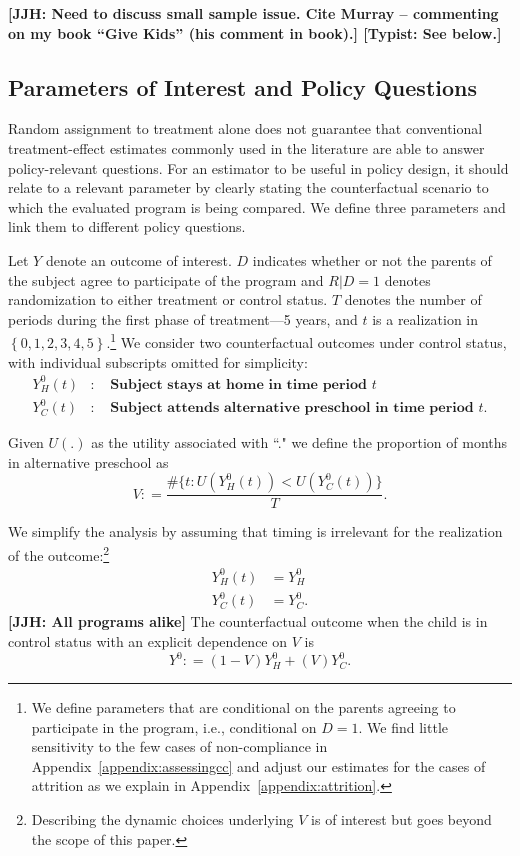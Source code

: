 \textbf{[JJH: Need to discuss small sample issue. Cite Murray -- commenting on my book ``Give Kids'' (his comment in book).] [Typist: See below.]}

\subsection{Parameters of Interest and Policy Questions} \label{section:methodsquestions}

Random assignment to treatment alone does not guarantee that conventional treatment-effect estimates commonly used in the literature are able to answer policy-relevant questions. For an estimator to be useful in policy design, it should relate to a relevant parameter by clearly stating the counterfactual scenario to which the evaluated program is being compared. We define three parameters and link them to different policy questions.

Let $Y$ denote an outcome of interest. $D$ indicates whether or not the parents of the subject agree to participate of the program and $R | D = 1$ denotes randomization to either treatment or control status. $T$ denotes the number of periods during the first phase of treatment---5 years, and $t$ is a realization in $\left\{ 0,1,2,3,4,5 \right\}$.\footnote{We define parameters that are conditional on the parents agreeing to participate in the program, i.e., conditional on $D = 1$. We find little sensitivity to the few cases of non-compliance in Appendix~\ref{appendix:assessingcc} and adjust our estimates for the cases of attrition as we explain in Appendix~\ref{appendix:attrition}.} We consider two counterfactual outcomes under control status, with individual subscripts omitted for simplicity:
\begin{eqnarray}
Y_H^0\left(t \right) &:& \textbf{ Subject stays at home in time period $t$} \nonumber \\
Y_C^0\left(t \right) &:& \textbf{ Subject attends alternative preschool in time period $t$}.  \nonumber
\end{eqnarray}

Given $U(.)$ as the utility associated with ``." we define the proportion of months in alternative preschool as
\begin{equation}
V : = \frac{\# \{ t: U(Y_H^0 \left( t \right)) < U(Y_C^0 \left( t \right)) \} }{T}.
\end{equation}

We simplify the analysis by assuming that timing is irrelevant for the realization of the outcome:\footnote{Describing the dynamic choices underlying $V$ is of interest but goes beyond the scope of this paper.}
\begin{align}
Y_H^0 \left( t \right) &= Y_H^0 \nonumber \\
Y_C^0 \left( t \right) &= Y_C^0.
\end{align}
\textbf{[JJH: All programs alike]} The counterfactual outcome when the child is in control status with an explicit dependence on $V$ is
\begin{equation}
Y^0 : = \left( 1 - V \right) Y_H^0 + \left( V \right) Y_C^0.
\end{equation}

